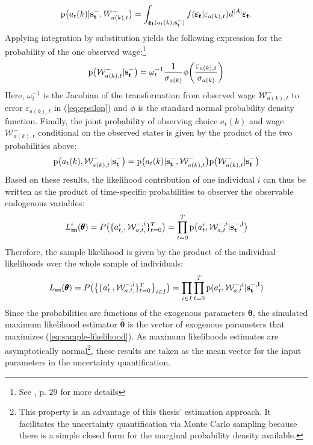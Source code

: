 \noindent
\begin{align}
\text{p}\big(a_t(k) | \bold{s_t^-},W^{-}_{a(k),t}\big) = \int_{\pmb{\varepsilon_t}(a_t(k),\bold{s_t^-})} f(\pmb{\varepsilon_t}|\varepsilon_{a(k),t}) d^{|A|} \pmb{\varepsilon_t}.
\end{align}
Applying integration by substitution yields the following expression for the probability of the one observed wage:\footnote{See \cite{Raabe.2019}, p. 29 for more details}
\begin{align}
\text{p}\big(\mathcal{W}^{-}_{a(k),t} | \bold{s_t^-}\big) = \omega_t^{-1} \frac{1}{\sigma_{a(k)}} \phi\bigg(\frac{\varepsilon_{a(k),t}}{\sigma_{a(k)}}\bigg)
\end{align}
Here, $\omega_t^{-1}$ is the Jacobian of the transformation from observed wage $\mathcal{W}^{-}_{a(k),t}$ to error $\varepsilon_{a(k),t}$ in (\ref{eq:epsilon}) and $\phi$ is the standard normal probability density function.
Finally, the joint probability of observing choice $a_t(k)$ and wage $\mathcal{W}^{-}_{a(k),t}$ conditional on the observed states is given by the product of the two probabilities above:
\begin{align}
\text{p}\big(a_t(k),\mathcal{W}^{-}_{a(k),t}|\bold{s_t^-}\big) = \text{p}\big(a_t(k)|\bold{s_t^-}, \mathcal{W}^{-}_{a(k),t}\big)\text{p}\big(\mathcal{W}^{-}_{a(k),t}|\bold{s_t^-}\big)
\end{align}
Based on these results, the likelihood contribution of one individual $i$ can thus be written as the product of time-specific probabilities to observer the observable endogenous variables:
\begin{align}
L^{i}_{\bold{m}}(\pmb{\theta}) = P\big(\{a_{t,}^{i},\mathcal{W}^{-,i}_{a,t,}\}_{t=0}^T\big) = \prod_{t=0}^{T} \text{p}\big(a_t^{i},\mathcal{W}_{a,t}^{-,i}|\bold{s_t^{-,i}}\big)
\end{align}
Therefore, the sample likelihood is given by the product of the individual likelihoods over the whole sample of individuals:
\begin{align} \label{eq:sample-likelihood}
L_{\bold{m}}(\pmb{\theta}) = P\big(\big\{\{a_{t,}^{i},\mathcal{W}^{-,i}_{a,t,}\}_{t=0}^T\big\}_{i \in I}\big) = \prod_{i \in I}\prod_{t=0}^{T} \text{p}(a_t^{i},\mathcal{W}_{a,t}^{-,i}|\bold{s_t^{-,i})}
\end{align}
Since the probabilities are functions of the exogenous parameters $\pmb{\theta}$, the simulated maximum likelihood estimator $\pmb{\hat{\theta}}$ is the vector of exogenous parameters that maximizes (\ref{eq:sample-likelihood}). As maximum likelihoods estimates are asymptotically normal\footnote{This property is an advantage of this thesis' estimation approach. It facilitates the uncertainty quantification via Monte Carlo sampling because there is a simple closed form for the marginal probability density available.}, these results are taken as the mean vector for the input parameters in the uncertainty quantification.

